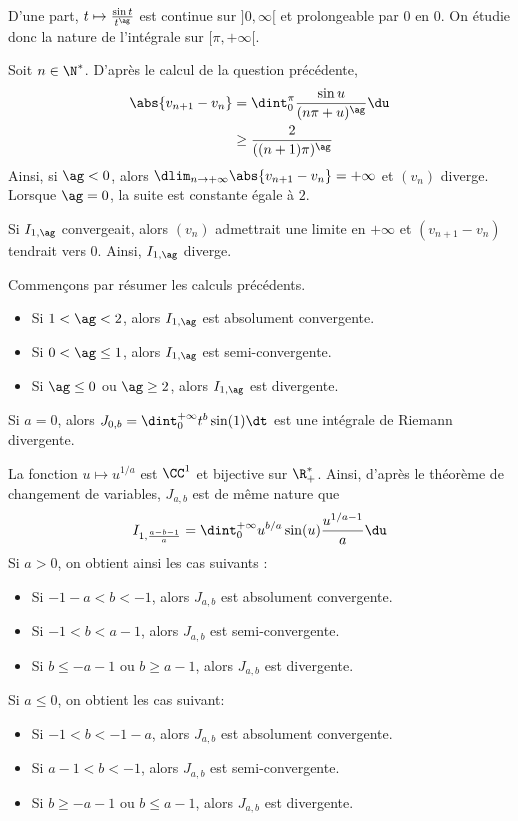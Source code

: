 \begin{solution}
\squ D'une part, $t \mapsto \frac{\sin t}{t^\ag}$ est continue sur $]0,\infty[$ et prolongeable par $0$ en $0$. On étudie donc la nature de l'intégrale sur $[\pi, +\infty[$.

Soit $n \in \N^*$. D'après le calcul de la question précédente,
\begin{align*}
\abs{v_{n+1} - v_n} &= \dint_0^\pi \frac{\sin u}{(n\pi+u)^\ag} \du \\
&\geq \frac{2}{((n+1) \pi)^\ag}
\end{align*}
Ainsi, si $\ag < 0$, alors $\dlim_{n\to+\infty} \abs{v_{n+1} - v_n} = +\infty$ et $(v_n)$ diverge. Lorsque $\ag = 0$, la suite est constante égale à $2$.

Si $I_{1,\ag}$ convergeait, alors $(v_n)$ admettrait une limite en $+\infty$ et $(v_{n+1} - v_n)$ tendrait vers $0$. Ainsi, $I_{1,\ag}$ diverge.

\qu Commençons par résumer les calculs précédents.
\begin{itemize}
\item Si $1 < \ag < 2$, alors $I_{1,\ag}$ est absolument convergente.
\item Si $0 < \ag \leq 1$, alors $I_{1,\ag}$ est semi-convergente.
\item Si $\ag \leq 0$ ou $\ag \geq 2$, alors $I_{1,\ag}$ est divergente.
\end{itemize}

\medskip

Si $a = 0$, alors $J_{0,b} = \dint_0^{+\infty} t^b \sin(1) \dt$ est une intégrale de Riemann divergente.

La fonction $u \mapsto u^{1/a}$ est $\CC^1$ et bijective sur $\R_+^*$. Ainsi, d'après le théorème de changement de variables, $J_{a,b}$ est de même nature que
\[
I_{1,\frac{a-b-1}{a}} = \dint_0^{+\infty} u^{b/a} \sin(u) \frac{u^{1/a-1}}{a} \du
\]
Si $a > 0$, on obtient ainsi les cas suivants :
\begin{itemize}
\item Si $-1-a<b<-1$, alors $J_{a,b}$ est absolument convergente.
\item Si $-1<b<a-1$, alors $J_{a,b}$ est semi-convergente.
\item Si $b \leq -a-1$ ou $b \geq a - 1$, alors $J_{a,b}$ est divergente.
\end{itemize}

Si $a \leq 0$, on obtient les cas suivant:
\begin{itemize}
\item Si $-1 < b < -1-a$, alors $J_{a,b}$ est absolument convergente.
\item Si $a-1 < b < -1$, alors $J_{a,b}$ est semi-convergente.
\item Si $b \geq -a-1$ ou $b \leq a - 1$, alors $J_{a,b}$ est divergente.
\end{itemize}


\end{solution}
